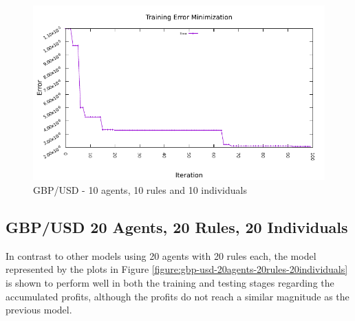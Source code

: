 \begin{figure}[htp]
  \medskip

  \includegraphics[width=.45\textwidth]{img/plots/gbp_usd_h1-10agents-10rules-10ind-100gen_error_minimization.pdf}

  \caption{GBP/USD - 10 agents, 10 rules and 10 individuals}
  \label{figure:gbp-usd-10agents-10rules-10individuals}
\end{figure}

\newpage

\subsection{GBP/USD 20 Agents, 20 Rules, 20 Individuals}
\label{results:forecast-gbp-usd-20agents-20rules-20individuals}

In contrast to other models using 20 agents with 20 rules each, the model
represented by the plots in Figure
\ref{figure:gbp-usd-20agents-20rules-20individuals} is shown to perform well in
both the training and testing stages regarding the accumulated profits, although
the profits do not reach a similar magnitude as the previous model.

